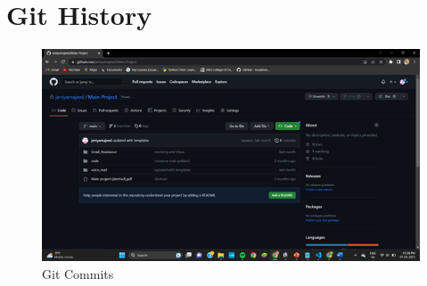 \documentclass[12pt]{report}
\begin{document}
\chapter{Git History}
\begin{figure}[htbp]
\begin{center}
  \includegraphics[scale=0.90]{4.png}
  \caption{Git Commits} 
   \label{fig:is}
\end{center}
\end{figure}
\end{document}
